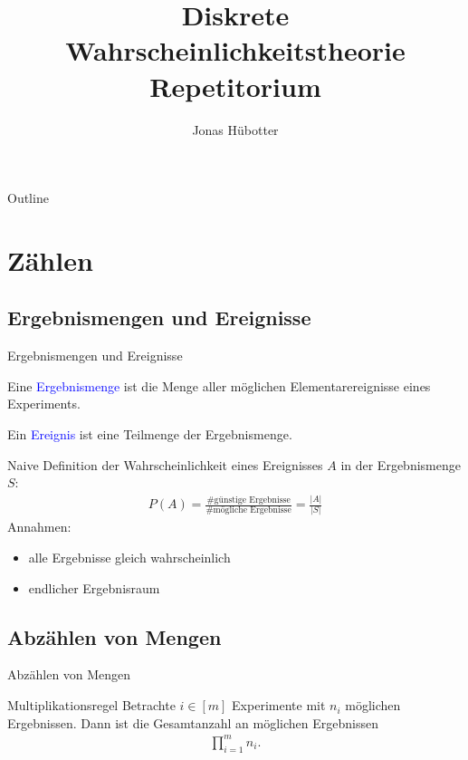 \documentclass{beamer}
\title[DWT Repetitorium]{Diskrete Wahrscheinlichkeitstheorie \\ Repetitorium}
\author{Jonas Hübotter}
\def\padding{\vspace{0.5cm}}
\def\b{\textcolor{blue}}
\begin{document}
\begin{frame}
  \titlepage
\end{frame}

\begin{frame}{Outline}
 \tableofcontents[subsectionstyle=hide, subsubsectionstyle=hide]
\end{frame}

\section{Zählen}

\subsection{Ergebnismengen und Ereignisse}
\begin{frame}{Ergebnismengen und Ereignisse}
    \begin{definition}
        Eine \b{Ergebnismenge} ist die Menge aller möglichen Elementarereignisse eines Experiments.
    \end{definition}\pause
    \begin{definition}
        Ein \b{Ereignis} ist eine Teilmenge der Ergebnismenge.
    \end{definition}\pause\padding
    Naive Definition der Wahrscheinlichkeit eines Ereignisses $A$ in der Ergebnismenge $S$:\pause
    \begin{align*}
        P(A) = \frac{\text{\# günstige Ergebnisse}}{\text{\# mögliche Ergebnisse}} = \frac{|A|}{|S|}
    \end{align*}\pause
    Annahmen:\pause
    \begin{itemize}
        \item alle Ergebnisse gleich wahrscheinlich\pause
        \item endlicher Ergebnisraum
    \end{itemize}
\end{frame}

\subsection{Abzählen von Mengen}
\begin{frame}{Abzählen von Mengen}
    \begin{block}{Multiplikationsregel}
        Betrachte $i \in [m]$ Experimente mit $n_i$ möglichen Ergebnissen. Dann ist die Gesamtanzahl an möglichen Ergebnissen
        \begin{align*}
            \prod_{i=1}^m n_i.
        \end{align*}
    \end{block}
\end{frame}
\end{document}
